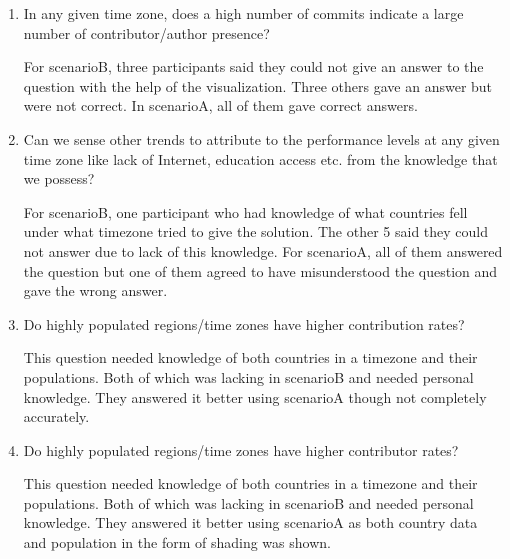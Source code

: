 \documentclass[seploa]{beavtex}
\begin{document}
\begin{enumerate}
\item In any given time zone, does a high number of commits indicate a large number of contributor/author presence?


For scenarioB, three participants said they could not give an answer to the question with the help of the visualization. Three others gave an answer but were not correct. In scenarioA, all of them gave correct answers.


\item Can we sense other trends to attribute to the performance levels at any given time zone like lack of Internet, education access etc. from the knowledge that we possess?


For scenarioB, one participant who had knowledge of what countries fell under what timezone tried to give the solution. The other 5 said they could not answer due to lack of this knowledge. For scenarioA, all of them answered the question but one of them agreed to have misunderstood the question and gave the wrong answer.


\item Do highly populated regions/time zones have higher contribution rates?


This question needed knowledge of both countries in a timezone and their populations. Both of which was lacking in scenarioB and needed personal knowledge. They answered it better using scenarioA though not completely accurately.

\item Do highly populated regions/time zones have higher contributor rates?


This question needed knowledge of both countries in a timezone and their populations. Both of which was lacking in scenarioB and needed personal knowledge. They answered it better using scenarioA as both country data and population in the form of shading was shown.


\end{enumerate}
\end{document}
